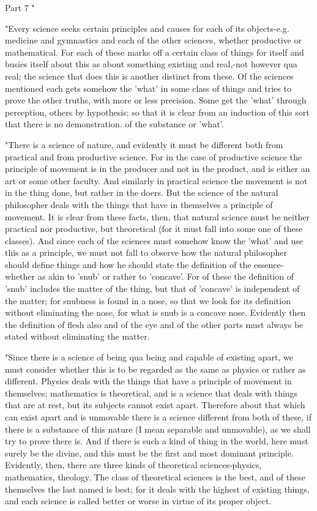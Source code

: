 Part 7 "

"Every science seeks certain principles and causes for each of its
objects-e.g. medicine and gymnastics and each of the other sciences,
whether productive or mathematical. For each of these marks off a
certain class of things for itself and busies itself about this as
about something existing and real,-not however qua real; the science
that does this is another distinct from these. Of the sciences mentioned
each gets somehow the 'what' in some class of things and tries to
prove the other truths, with more or less precision. Some get the
'what' through perception, others by hypothesis; so that it is clear
from an induction of this sort that there is no demonstration. of
the substance or 'what'. 

"There is a science of nature, and evidently it must be different
both from practical and from productive science. For in the case of
productive science the principle of movement is in the producer and
not in the product, and is either an art or some other faculty. And
similarly in practical science the movement is not in the thing done,
but rather in the doers. But the science of the natural philosopher
deals with the things that have in themselves a principle of movement.
It is clear from these facts, then, that natural science must be neither
practical nor productive, but theoretical (for it must fall into some
one of these classes). And since each of the sciences must somehow
know the 'what' and use this as a principle, we must not fall to observe
how the natural philosopher should define things and how he should
state the definition of the essence-whether as akin to 'snub' or rather
to 'concave'. For of these the definition of 'snub' includes the matter
of the thing, but that of 'concave' is independent of the matter;
for snubness is found in a nose, so that we look for its definition
without eliminating the nose, for what is snub is a concave nose.
Evidently then the definition of flesh also and of the eye and of
the other parts must always be stated without eliminating the matter.

"Since there is a science of being qua being and capable of existing
apart, we must consider whether this is to be regarded as the same
as physics or rather as different. Physics deals with the things that
have a principle of movement in themselves; mathematics is theoretical,
and is a science that deals with things that are at rest, but its
subjects cannot exist apart. Therefore about that which can exist
apart and is unmovable there is a science different from both of these,
if there is a substance of this nature (I mean separable and unmovable),
as we shall try to prove there is. And if there is such a kind of
thing in the world, here must surely be the divine, and this must
be the first and most dominant principle. Evidently, then, there are
three kinds of theoretical sciences-physics, mathematics, theology.
The class of theoretical sciences is the best, and of these themselves
the last named is best; for it deals with the highest of existing
things, and each science is called better or worse in virtue of its
proper object. 

